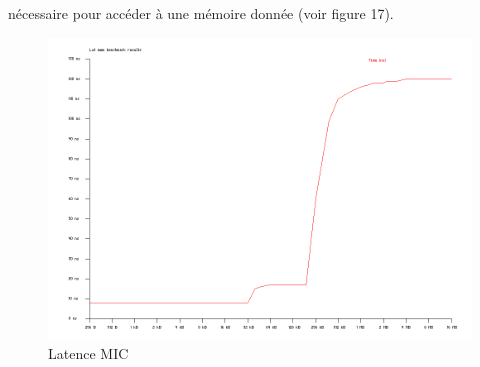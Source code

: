\documentclass{article}
\begin{document}
					nécessaire pour accéder à une mémoire donnée (voir figure 17).
					\begin{figure}[!b]
					\begin{center}
					\includegraphics[scale=0.33]{latmem.png}
					\caption{Latence MIC}
					\end{center}
					\end{figure}
\end{document}
